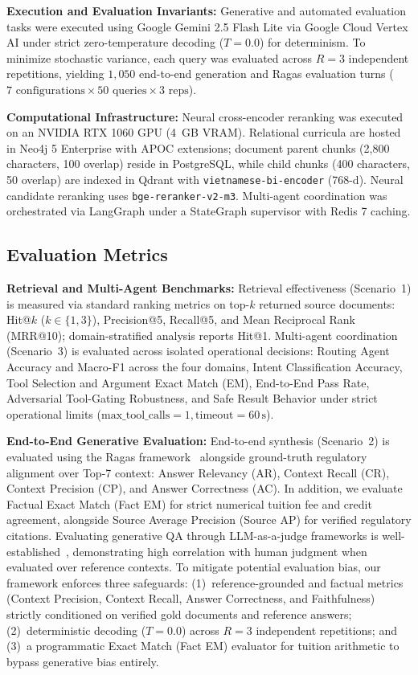 \noindent\textbf{Execution and Evaluation Invariants:} Generative and automated evaluation tasks were executed using Google Gemini 2.5 Flash Lite via Google Cloud Vertex AI under strict zero-temperature decoding ($T=0.0$) for determinism. To minimize stochastic variance, each query was evaluated across $R=3$ independent repetitions, yielding $1,050$ end-to-end generation and Ragas evaluation turns ($7\text{ configurations} \times 50\text{ queries} \times 3\text{ reps}$).

\noindent\textbf{Computational Infrastructure:} Neural cross-encoder reranking was executed on an NVIDIA RTX 1060 GPU (4~GB VRAM). Relational curricula are hosted in Neo4j 5 Enterprise with APOC extensions; document parent chunks (2,800 characters, 100 overlap) reside in PostgreSQL, while child chunks (400 characters, 50 overlap) are indexed in Qdrant with \texttt{vietnamese-bi-encoder} (768-d). Neural candidate reranking uses \texttt{bge-reranker-v2-m3}. Multi-agent coordination was orchestrated via LangGraph under a StateGraph supervisor with Redis 7 caching.

\subsection{Evaluation Metrics}
\label{sec:metrics}

\noindent\textbf{Retrieval and Multi-Agent Benchmarks:} Retrieval effectiveness (Scenario~1) is measured via standard ranking metrics on top-$k$ returned source documents: Hit@$k$ ($k \in \{1, 3\}$), Precision@5, Recall@5, and Mean Reciprocal Rank (MRR@10); domain-stratified analysis reports Hit@1. Multi-agent coordination (Scenario~3) is evaluated across isolated operational decisions: Routing Agent Accuracy and Macro-F1 across the four domains, Intent Classification Accuracy, Tool Selection and Argument Exact Match (EM), End-to-End Pass Rate, Adversarial Tool-Gating Robustness, and Safe Result Behavior under strict operational limits ($\text{max\_tool\_calls}=1, \text{timeout}=60\,\text{s}$).

\noindent\textbf{End-to-End Generative Evaluation:} End-to-end synthesis (Scenario~2) is evaluated using the Ragas framework~\cite{es2023ragas} alongside ground-truth regulatory alignment over Top-7 context: Answer Relevancy (AR), Context Recall (CR), Context Precision (CP), and Answer Correctness (AC). In addition, we evaluate Factual Exact Match (Fact EM) for strict numerical tuition fee and credit agreement, alongside Source Average Precision (Source AP) for verified regulatory citations. Evaluating generative QA through LLM-as-a-judge frameworks is well-established~\cite{zheng2023judging,es2023ragas}, demonstrating high correlation with human judgment when evaluated over reference contexts. To mitigate potential evaluation bias, our framework enforces three safeguards: (1)~reference-grounded and factual metrics (Context Precision, Context Recall, Answer Correctness, and Faithfulness) strictly conditioned on verified gold documents and reference answers; (2)~deterministic decoding ($T=0.0$) across $R=3$ independent repetitions; and (3)~a programmatic Exact Match (Fact EM) evaluator for tuition arithmetic to bypass generative bias entirely.


